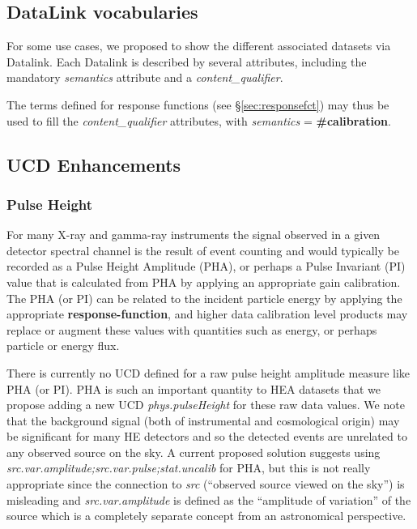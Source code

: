 \documentclass[11pt,a4paper]{ivoa}
\begin{document}
\subsection{DataLink vocabularies}\label{sec:DLs}

For some use cases, we proposed to show the different associated datasets via Datalink. Each Datalink is described by several attributes, including the mandatory {\em semantics} attribute and a {\em content\_qualifier}.

The terms defined for response functions (see \S\ref{sec:responsefct}) may thus be used to fill the {\em content\_qualifier} attributes, with {\em semantics} = {\bf \#calibration}.


\subsection{UCD Enhancements}\label{sec:UCDs}

\subsubsection{Pulse Height}

For many X-ray and gamma-ray instruments the signal observed in a given detector spectral channel is the result of event counting and would typically be recorded as a Pulse Height Amplitude (PHA), or perhaps a Pulse Invariant (PI) value that is calculated from PHA by applying an appropriate gain calibration.  The PHA (or PI) can be related to the incident particle energy by applying the appropriate {\bf response-function}, and higher data calibration level products may replace or augment these values with quantities such as energy, or perhaps particle or energy flux.

There is currently no UCD defined for a raw pulse height amplitude measure like PHA (or PI). PHA is such an important quantity to \gls{HEA} datasets that we propose adding a new UCD {\em phys.pulseHeight\/} for these raw data values.  We note that the background signal (both of instrumental and cosmological origin) may be significant for many \gls{HE} detectors and so the detected events are unrelated to any observed source on the sky.  A current proposed solution suggests using {\em src.var.amplitude;src.var.pulse;stat.uncalib\/} for PHA, but this is not really appropriate since the connection to {\em src\/} (``observed source viewed on the sky'') is misleading and {\em src.var.amplitude\/} is defined as the ``amplitude of variation'' of the source which is a completely separate concept from an astronomical perspective.
\end{document}
